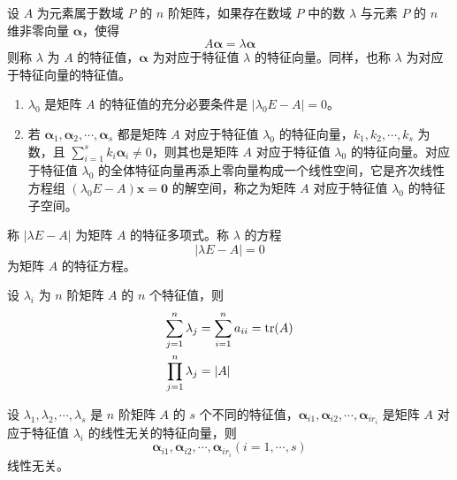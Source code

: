 \documentclass{ctexbook}
\begin{document}
\begin{definition}[特征值与特征向量]
    设 $A$ 为元素属于数域 $P$ 的 $n$ 阶矩阵，如果存在数域 $P$ 中的数 $\lambda$ 与元素 $P$ 的 $n$ 维非零向量 $\boldsymbol{\alpha}$，使得
    \begin{equation}
        A\boldsymbol{\alpha}=\lambda\boldsymbol{\alpha}
    \end{equation}
    则称 $\lambda$ 为 $A$ 的特征值，$\boldsymbol{\alpha}$ 为对应于特征值 $\lambda$  的特征向量。同样，也称 $\lambda$ 为对应于特征向量的特征值。
    \begin{enumerate}
        \item $\lambda_0$ 是矩阵 $A$ 的特征值的充分必要条件是 $|\lambda_0 E-A|=0$。
        \item 若 $\boldsymbol{\alpha}_1,\boldsymbol{\alpha}_2,\cdots,\boldsymbol{\alpha}_s$ 都是矩阵 $A$ 对应于特征值 $\lambda_0$ 的特征向量，$k_1,k_2,\cdots,k_s$ 为数，且 $\sum_{i=1}^s k_i\boldsymbol{\alpha}_i\neq 0$，则其也是矩阵 $A$ 对应于特征值 $\lambda_0$ 的特征向量。对应于特征值 $\lambda_0$ 的全体特征向量再添上零向量构成一个线性空间，它是齐次线性方程组 $(\lambda_0E-A)\boldsymbol{x}=\boldsymbol{0}$ 的解空间，称之为矩阵 $A$ 对应于特征值 $\lambda_0$ 的特征子空间。
    \end{enumerate}
\end{definition}

\begin{definition}[特征多项式与特征方程]
    称 $|\lambda E-A|$ 为矩阵 $A$ 的特征多项式。称 $\lambda$ 的方程
    \begin{equation}
        |\lambda E-A|=0
    \end{equation}
    为矩阵 $A$ 的特征方程。
\end{definition}

\begin{theorem}[特征值的性质]
    设 $\lambda_i$ 为 $n$ 阶矩阵 $A$ 的 $n$ 个特征值，则
    \begin{align}
        \sum_{j=1}^n\lambda_j&=\sum_{i=1}^n a_{ii}=\textnormal{tr}(A)\\
        \prod_{j=1}^n\lambda_j&=|A|
    \end{align}
\end{theorem}

\begin{theorem}[特征向量线性无关]
    设 $\lambda_1,\lambda_2,\cdots,\lambda_s$ 是 $n$ 阶矩阵 $A$ 的 $s$ 个不同的特征值，$\boldsymbol{\alpha}_{i1},\boldsymbol{\alpha}_{i2},\cdots,\boldsymbol{\alpha}_{ir_i}$ 是矩阵 $A$ 对应于特征值 $\lambda_i$ 的线性无关的特征向量，则
    \begin{equation}
        \boldsymbol{\alpha}_{i1},\boldsymbol{\alpha}_{i2},\cdots,\boldsymbol{\alpha}_{ir_i} (i=1,\cdots,s)
    \end{equation}
    线性无关。
\end{theorem}
\end{document}
